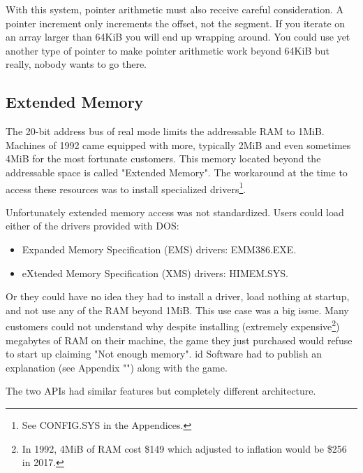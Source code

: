 \documentclass[book.tex]{subfiles}
\begin{document}
\begin{minipage}{\textwidth}

\end{minipage}
\par

With this system, pointer arithmetic must also receive careful consideration. A  pointer increment only increments the offset, not the segment. If you iterate on an array larger than 64KiB you will end up wrapping around. You could use yet another type of pointer  to make pointer arithmetic work beyond 64KiB but really, nobody wants to go there.




  \subsection{Extended Memory}

The 20-bit address bus of real mode limits the addressable RAM to 1MiB. Machines of 1992 came equipped with more, typically 2MiB and even sometimes 4MiB for the most fortunate customers. This memory located beyond the addressable space is called "Extended Memory". The workaround at the time to access these resources was to install specialized drivers\footnote{See CONFIG.SYS in the Appendices.}.\\
\par
Unfortunately extended memory access was not standardized. Users could load either of the drivers provided with DOS:
\begin{itemize}
\item Expanded Memory Specification (EMS) drivers: EMM386.EXE.
\item eXtended Memory Specification (XMS) drivers: HIMEM.SYS.
\end{itemize}

Or they could have no idea they had to install a driver, load nothing at startup, and not use any of the RAM beyond 1MiB. This use case was a big issue. Many customers could not understand why despite installing (extremely expensive\footnote{In 1992, 4MiB of RAM cost \$149 which adjusted to inflation would be \$256 in 2017.}) megabytes of RAM on their machine, the game they just purchased would refuse to start up claiming "Not enough memory". id Software had to publish an explanation (see Appendix "") along with the game.\\
\par

The two APIs had similar features but completely different architecture.\\
\par
\end{document}
